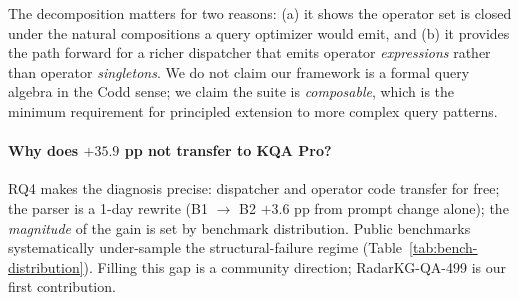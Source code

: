 \documentclass[10pt,a4paper,twocolumn]{article}
\begin{document}
The decomposition matters for two reasons: (a) it shows the operator set is closed under the natural compositions a query optimizer would emit, and (b) it provides the path forward for a richer dispatcher that emits operator \emph{expressions} rather than operator \emph{singletons}. We do not claim our framework is a formal query algebra in the Codd \citep{codd1970relational} sense; we claim the suite is \emph{composable}, which is the minimum requirement for principled extension to more complex query patterns.

\paragraph{Why does \texorpdfstring{$+35.9$}{+35.9} pp not transfer to KQA Pro?}
RQ4 makes the diagnosis precise: dispatcher and operator code transfer for free; the parser is a 1-day rewrite (B1 $\to$ B2 $+3.6$ pp from prompt change alone); the \emph{magnitude} of the gain is set by benchmark distribution. Public benchmarks systematically under-sample the structural-failure regime (Table~\ref{tab:bench-distribution}). Filling this gap is a community direction; RadarKG-QA-499 is our first contribution.
\end{document}
